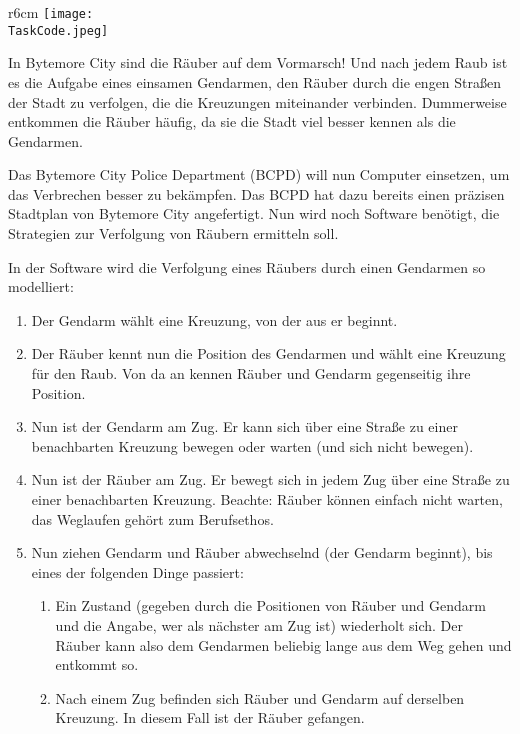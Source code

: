 \documentclass{boi2014-de}
\renewcommand{\TaskCode}{coprobber}
\begin{document}
    \begin{wrapfigure}{r}{6cm}
		\texttt{[image: \\TaskCode.jpeg]}
	\end{wrapfigure}

    In Bytemore City sind die Räuber auf dem Vormarsch!  Und nach jedem Raub
    ist es die Aufgabe eines einsamen Gendarmen, den Räuber durch die engen Straßen
    der Stadt zu verfolgen, die die Kreuzungen miteinander verbinden.
    Dummerweise entkommen die Räuber häufig, da sie die Stadt viel besser kennen als die Gendarmen.

    Das Bytemore City Police Department (BCPD) will nun Computer einsetzen,
    um das Verbrechen besser zu bekämpfen. Das BCPD hat dazu bereits einen präzisen
    Stadtplan von Bytemore City angefertigt. Nun wird noch Software benötigt,
    die Strategien zur Verfolgung von Räubern ermitteln soll.

    In der Software wird die Verfolgung eines Räubers durch einen Gendarmen so modelliert:
    \begin{enumerate}
        \item 
        Der Gendarm wählt eine Kreuzung, von der aus er beginnt.
        \item 
            Der Räuber kennt nun die Position des Gendarmen und wählt eine Kreuzung für den Raub.
            Von da an kennen Räuber und Gendarm gegenseitig ihre Position.
        \item 
            Nun ist der Gendarm am Zug.  Er kann sich über eine Straße zu einer benachbarten Kreuzung bewegen 
            oder warten (und sich nicht bewegen).
        \item 
            Nun ist der Räuber am Zug.  Er bewegt sich in jedem Zug über eine Straße zu einer benachbarten Kreuzung.
            Beachte: Räuber können einfach nicht warten, das Weglaufen gehört zum Berufsethos.
        \item 
        Nun ziehen Gendarm und Räuber abwechselnd (der Gendarm beginnt),
        bis eines der folgenden Dinge passiert:
        
        \begin{enumerate}
            \item 
                Ein Zustand (gegeben durch die Positionen von Räuber und Gendarm und die
                Angabe, wer als nächster am Zug ist) wiederholt sich.
                Der Räuber kann also dem Gendarmen beliebig lange aus dem Weg gehen und entkommt so.
            \item 
                Nach einem Zug befinden sich Räuber und Gendarm auf derselben Kreuzung.
                In diesem Fall ist der Räuber gefangen.
        \end{enumerate}
    \end{enumerate}
\end{document}
